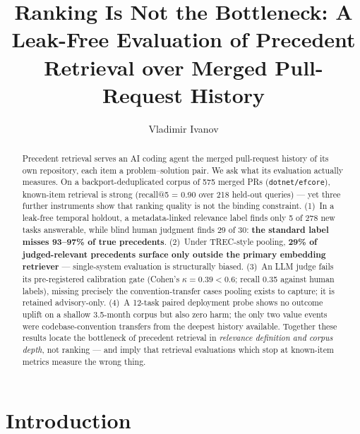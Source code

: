 \documentclass[sigconf,nonacm]{acmart}
\begin{document}
\title{Ranking Is Not the Bottleneck: A Leak-Free Evaluation of
  Precedent Retrieval over Merged Pull-Request History}

\author{Vladimir Ivanov}

\begin{abstract}
Precedent retrieval serves an AI coding agent the merged pull-request
history of its own repository, each item a problem--solution pair. We ask
what its evaluation actually measures. On a backport-deduplicated corpus of
575 merged PRs (\texttt{dotnet/efcore}), known-item retrieval is strong
(recall@5 = 0.90 over 218 held-out queries) --- yet three further
instruments show that ranking quality is not the binding constraint.
(1)~In a leak-free temporal holdout, a metadata-linked relevance label
finds only 5 of 278 new tasks answerable, while blind human judgment finds
29 of 30: \textbf{the standard label misses 93--97\% of true precedents}.
(2)~Under TREC-style pooling, \textbf{29\% of judged-relevant precedents
surface only outside the primary embedding retriever} --- single-system
evaluation is structurally biased. (3)~An LLM judge fails its
pre-registered calibration gate (Cohen's $\kappa = 0.39 < 0.6$; recall
0.35 against human labels), missing precisely the convention-transfer
cases pooling exists to capture; it is retained advisory-only. (4)~A
12-task paired deployment probe shows no outcome uplift on a shallow
3.5-month corpus but also zero harm; the only two value events were
codebase-convention transfers from the deepest history available.
Together these results locate the bottleneck of precedent retrieval in
\emph{relevance definition and corpus depth}, not ranking --- and imply
that retrieval evaluations which stop at known-item metrics measure the
wrong thing.
\end{abstract}


\maketitle

\section{Introduction}
\label{sec:intro}
\end{document}
